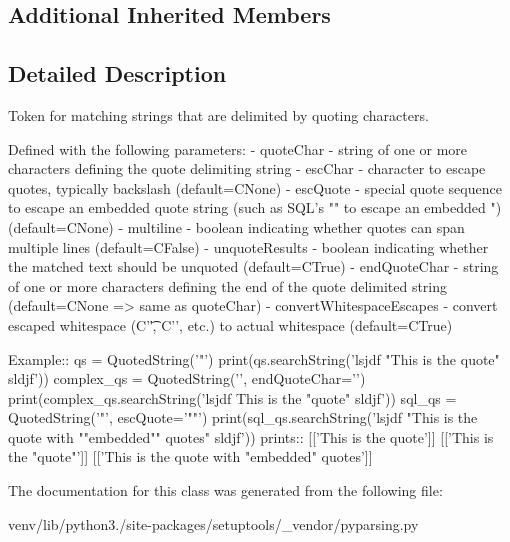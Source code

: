 \subsection*{Additional Inherited Members}


\subsection{Detailed Description}
\begin{DoxyVerb}Token for matching strings that are delimited by quoting characters.

Defined with the following parameters:
    - quoteChar - string of one or more characters defining the quote delimiting string
    - escChar - character to escape quotes, typically backslash (default=C{None})
    - escQuote - special quote sequence to escape an embedded quote string (such as SQL's "" to escape an embedded ") (default=C{None})
    - multiline - boolean indicating whether quotes can span multiple lines (default=C{False})
    - unquoteResults - boolean indicating whether the matched text should be unquoted (default=C{True})
    - endQuoteChar - string of one or more characters defining the end of the quote delimited string (default=C{None} => same as quoteChar)
    - convertWhitespaceEscapes - convert escaped whitespace (C{'\t'}, C{'\n'}, etc.) to actual whitespace (default=C{True})

Example::
    qs = QuotedString('"')
    print(qs.searchString('lsjdf "This is the quote" sldjf'))
    complex_qs = QuotedString('{{', endQuoteChar='}}')
    print(complex_qs.searchString('lsjdf {{This is the "quote"}} sldjf'))
    sql_qs = QuotedString('"', escQuote='""')
    print(sql_qs.searchString('lsjdf "This is the quote with ""embedded"" quotes" sldjf'))
prints::
    [['This is the quote']]
    [['This is the "quote"']]
    [['This is the quote with "embedded" quotes']]
\end{DoxyVerb}
 

The documentation for this class was generated from the following file\+:\begin{DoxyCompactItemize}
\item 
venv/lib/python3./site-\/packages/setuptools/\+\_\+vendor/pyparsing.\+py\end{DoxyCompactItemize}
